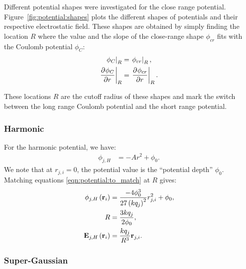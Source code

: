 Different potential shapes were investigated for the close range potential.
Figure~\ref{fig:potential:shapes} plots the different shapes of potentials and
their respective electrostatic field. These shapes are obtained by simply
finding the location $R$ where the value and the slope of the close-range shape
$\phi_{cr}$ fits with the Coulomb potential $\phi_C$:
\begin{subequations}
\begin{align}
\left. \phi_C        \right|_{R} & = \left. \phi_{cr} \right|_{R}, \\
\left. \frac{\partial^{{}} \phi_C}{\partial r^{{}}} \right|_{R} & = \left. \frac{\partial^{{}} \phi_{cr}}{\partial r^{{}}} \right|_{R}.
\end{align}
\label{eqn:potential:to_match}
\end{subequations}

These locations $R$ are the cutoff radius of these shapes and mark the switch
between the long range Coulomb potential and the short range potential.


\subsubsection{Harmonic}

For the harmonic potential, we have:
\begin{align}
\phi_{j,H} & = -A r^2 + \phi_0.
\end{align}
We note that at $r_{j,i} = 0$, the potential value is the ``potential depth''
$\phi_0$.
Matching equations \eqref{eqn:potential:to_match} at $R$ gives:
\begin{subequations}
\begin{align}
\phi_{j,H}\left( \textbf{r}_i \right) & = \frac{-4 \phi_0^3}{27 \left( k q_j \right)^2} r_{j,i}^2 + \phi_0,
\\
R & = \frac{3 k q_j}{2 \phi_0}, \\
\textbf{E}_{j,H}\left( \textbf{r}_i \right) & = \frac{k q_j}{R^3} \textbf{r}_{j,i}.
\end{align}
\end{subequations}


\subsubsection{Super-Gaussian}


